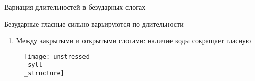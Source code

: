 \documentclass[10 pt, handout]{beamer}
\begin{document}
\begin{frame}{Вариация длительностей в безударных слогах}

	Безударные гласные сильно варьируются по длительности
	\vspace*{1em}

	\begin{enumerate}[\ding{102}]
		\item Между закрытыми и открытыми слогами: наличие коды сокращает гласную
	\end{enumerate}
	
	\begin{figure}[H]
		\texttt{[image: unstressed\\\_syll\\\_structure]}
	\end{figure}

\end{frame}

%
%
%	
%	
\end{document}
